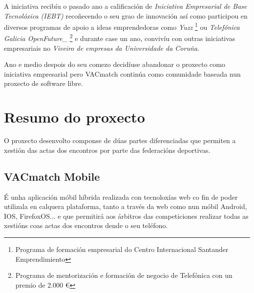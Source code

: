     A iniciativa recibíu o pasado ano a calificación de \emph{Iniciativa Empresarial de 
Base Tecnolóxica (IEBT)} recoñecendo o seu grao de innovación así como participou en 
diversos programas de apoio a ideas emprendedoras como \emph{Yuzz} 
\footnote{Programa de formación empresarial do Centro Internacional Santander 
Emprendimiento} ou \emph{Telefónica Galicia OpenFuture\_} \footnote{Programa de 
mentorización e formación de negocio de Telefónica con un premio de 2.000 
\euro{}} e durante case un ano, convivíu con 
outras iniciativas empresariais no \emph{Viveiro de empresas da Universidade da 
Coruña}.

    Ano e medio despois do seu comezo decidíuse abandonar o proxecto 
como iniciativa empresarial pero VACmatch continúa como comunidade baseada nun 
proxecto de software libre.

    \section{Resumo do proxecto}
    O proxecto desenvolto componse de dúas partes diferenciadas que permiten a 
xestión das actas dos encontros por parte das federacións deportivas.
    
    \subsection{VACmatch Mobile}
    É unha aplicación móbil híbrida realizada con tecnoloxías web co fin de 
poder utilizala en calquera plataforma, tanto a través da web como nun móbil 
Android, IOS, FirefoxOS... e que permitirá aos árbitros das competiciones 
realizar todas as xestións coas actas dos encontros dende o seu teléfono.


